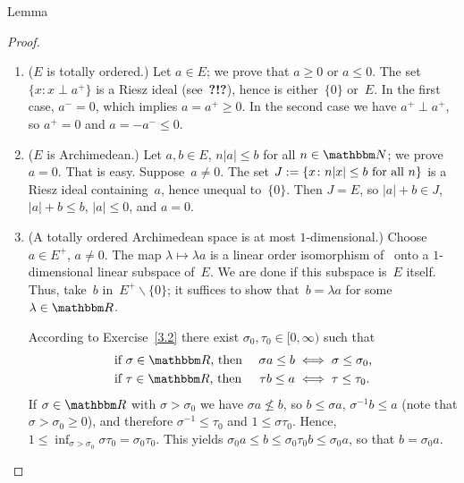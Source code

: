 \documentclass[main.tex]{subfiles}
\begin{document}
%
%
\begin{psec}{3.5}{Lemma}
\end{psec}
\begin{proof}
\begin{enumerate}[label=(\Roman*)]
\item \label{3.5-I} 
($E$ is totally ordered.) 
Let $a\in E$; 
we prove that $a\geq 0$ or $a\leq 0$.
The set $\{ x\colon x\perp a^+ \}$
is a Riesz ideal (see~\textbf{?!?}),
hence is either~$\{0\}$ or~$E$.
In the first case,
$a^-=0$, 
which implies $a=a^+\geq 0$.
In the second case
we have $a^+ \perp a^+$, so $a^+=0$ 
and $a=-a^-\leq 0$.
%
\item \label{3.5-II}
($E$ is Archimedean.)
Let $a,b\in E$, $n|a|\leq b$ for all $n\in \N$;
we prove $a=0$. 
That is easy. 
Suppose~$a\neq 0$.
The set $J:=\{ x\colon n|x|\leq b\text{ for all }n\}$
is a Riesz ideal containing~$a$,
hence unequal to~$\{0\}$.
Then $J=E$,
so $|a|+b\in J$,
$|a|+b\leq b$,
$|a|\leq 0$,
and $a=0$.
%
\item \label{3.5-III} 
(A totally ordered Archimedean space is at most $1$-dimensional.)
Choose $a\in E^+$, $a\neq 0$.
The map $\lambda \mapsto \lambda a$ 
is a linear order isomorphism
of~\R{} onto a $1$-dimensional linear subspace of~$E$.
We are done if this subspace is~$E$ itself.
Thus, take~$b$ in~$E^+\backslash\{0\}$;
it suffices to show that~$b=\lambda a$
for some $\lambda \in \R$.

According to Exercise~\ref{3.2} there exist
$\sigma_0,\tau_0\in[0,\infty)$ such that
\begin{alignat*}{2}
&\htam{ if }\sigma\in\R\htam{, then }
  & \sigma a\leq b 
  &\iff \sigma\leq\sigma_0\htam{, } \\
&\htam{ if }\tau\in\R\htam{, then }
  & \tau b \leq a 
  &\iff \tau \leq \tau_0\htam{.}
\end{alignat*}
If $\sigma\in\R$ with $\sigma>\sigma_0$
we have $\sigma a\nleq b$,
so $b\leq \sigma a$,
$\sigma^{-1} b\leq a$
(note that $\sigma > \sigma_0 \geq 0$),
and therefore $\sigma^{-1}\leq \tau_0$
and $1\leq \sigma\tau_0$.
Hence, $1\leq \inf_{\sigma > \sigma_0}\sigma \tau_0 = \sigma_0 \tau_0$.
This yields $\sigma_0 a \leq b \leq \sigma_0 \tau_0 b \leq \sigma_0 a$,
so that $b = \sigma_0 a$. \xqed
\end{enumerate}
\end{proof}
\clearpage
\end{document}
